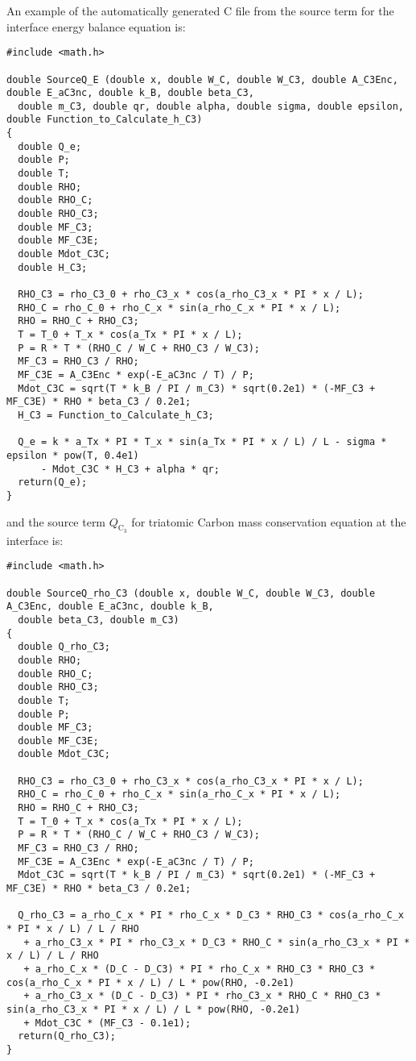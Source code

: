 \documentclass[10pt]{article}
\newcommand{\C}{\text{C}}
\begin{document}
An example of the automatically generated C file from the source term for the interface energy balance equation is:
\begin{footnotesize}            
 \begin{verbatim}#include <math.h>

double SourceQ_E (double x, double W_C, double W_C3, double A_C3Enc, double E_aC3nc, double k_B, double beta_C3,
  double m_C3, double qr, double alpha, double sigma, double epsilon, double Function_to_Calculate_h_C3)
{
  double Q_e;
  double P;
  double T;
  double RHO;
  double RHO_C;
  double RHO_C3;
  double MF_C3;
  double MF_C3E;
  double Mdot_C3C;
  double H_C3;

  RHO_C3 = rho_C3_0 + rho_C3_x * cos(a_rho_C3_x * PI * x / L);
  RHO_C = rho_C_0 + rho_C_x * sin(a_rho_C_x * PI * x / L);
  RHO = RHO_C + RHO_C3;
  T = T_0 + T_x * cos(a_Tx * PI * x / L);
  P = R * T * (RHO_C / W_C + RHO_C3 / W_C3);
  MF_C3 = RHO_C3 / RHO;
  MF_C3E = A_C3Enc * exp(-E_aC3nc / T) / P;
  Mdot_C3C = sqrt(T * k_B / PI / m_C3) * sqrt(0.2e1) * (-MF_C3 + MF_C3E) * RHO * beta_C3 / 0.2e1;
  H_C3 = Function_to_Calculate_h_C3;

  Q_e = k * a_Tx * PI * T_x * sin(a_Tx * PI * x / L) / L - sigma * epsilon * pow(T, 0.4e1) 
      - Mdot_C3C * H_C3 + alpha * qr;
  return(Q_e);
}
 \end{verbatim}
 \end{footnotesize}
%
and the source term $Q_{\C_3}$ for triatomic Carbon mass conservation equation at the interface is:
%
\begin{footnotesize}
\begin{verbatim}#include <math.h>

double SourceQ_rho_C3 (double x, double W_C, double W_C3, double A_C3Enc, double E_aC3nc, double k_B,
  double beta_C3, double m_C3)
{
  double Q_rho_C3;
  double RHO;
  double RHO_C;
  double RHO_C3;
  double T;
  double P;
  double MF_C3;
  double MF_C3E;
  double Mdot_C3C;

  RHO_C3 = rho_C3_0 + rho_C3_x * cos(a_rho_C3_x * PI * x / L);
  RHO_C = rho_C_0 + rho_C_x * sin(a_rho_C_x * PI * x / L);
  RHO = RHO_C + RHO_C3;
  T = T_0 + T_x * cos(a_Tx * PI * x / L);
  P = R * T * (RHO_C / W_C + RHO_C3 / W_C3);
  MF_C3 = RHO_C3 / RHO;
  MF_C3E = A_C3Enc * exp(-E_aC3nc / T) / P;
  Mdot_C3C = sqrt(T * k_B / PI / m_C3) * sqrt(0.2e1) * (-MF_C3 + MF_C3E) * RHO * beta_C3 / 0.2e1;

  Q_rho_C3 = a_rho_C_x * PI * rho_C_x * D_C3 * RHO_C3 * cos(a_rho_C_x * PI * x / L) / L / RHO 
   + a_rho_C3_x * PI * rho_C3_x * D_C3 * RHO_C * sin(a_rho_C3_x * PI * x / L) / L / RHO 
   + a_rho_C_x * (D_C - D_C3) * PI * rho_C_x * RHO_C3 * RHO_C3 * cos(a_rho_C_x * PI * x / L) / L * pow(RHO, -0.2e1) 
   + a_rho_C3_x * (D_C - D_C3) * PI * rho_C3_x * RHO_C * RHO_C3 * sin(a_rho_C3_x * PI * x / L) / L * pow(RHO, -0.2e1) 
   + Mdot_C3C * (MF_C3 - 0.1e1);
  return(Q_rho_C3);
}
\end{verbatim}
\end{footnotesize}
\end{document}
